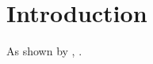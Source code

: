 \section{Introduction}
\label{sec:paper1:intro}
\lipsum[1] As shown by \citet{examplePaper1}, \lipsum[2][1-3] \citep{examplePaper1}.
